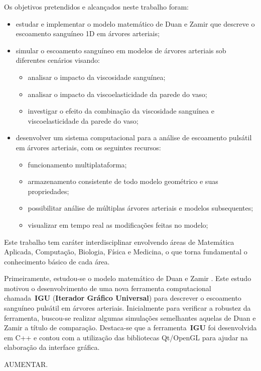 \documentclass[
        english,			
        brazil			        %
        ,<...>]{abntbibufjf}
\begin{document}
Os objetivos pretendidos e alcançados neste trabalho foram:
\begin{itemize}
	\item estudar e implementar o modelo matemático de Duan e Zamir que descreve o escoamento sanguíneo 1D em árvores arteriais;
	\item simular o escoamento sanguíneo em modelos de árvores arteriais sob diferentes cenários visando:
	\begin{itemize}
		\item analisar o impacto da viscosidade sanguínea;
		\item analisar o impacto da viscoelasticidade da parede do vaso;
		\item investigar o efeito da combinação da viscosidade sanguínea e viscoelasticidade da parede do vaso;
	\end{itemize} 
	\item desenvolver um sistema computacional para a análise de escoamento pulsátil em árvores arteriais, com os seguintes recursos:
	\begin{itemize}
		\item funcionamento multiplataforma;
		\item armazenamento consistente de todo modelo geométrico e suas propriedades;
		\item possibilitar análise de múltiplas árvores arteriais e modelos subsequentes;
		\item visualizar em tempo real as modificações feitas no modelo;
	\end{itemize} 
\end{itemize}

Este trabalho tem caráter interdisciplinar envolvendo áreas de Matemática Aplicada,
Computação, Biologia, Física e Medicina, o que torna fundamental o conhecimento
básico de cada área.

Primeiramente, estudou-se o modelo matemático de Duan e Zamir \cite{Duan}. Este estudo motivou o desenvolvimento de uma nova ferramenta computacional chamada~\textbf{IGU} (\textbf{Iterador Gráfico Universal}) para descrever o escoamento sanguíneo pulsátil em árvores arteriais. Inicialmente para verificar a robustez da ferramenta, buscou-se realizar algumas simulações semelhantes aquelas de Duan e Zamir a título de comparação. Destaca-se que a ferramenta~\textbf{IGU} foi desenvolvida em C++ e  contou com a utilização das bibliotecas Qt/OpenGL para ajudar na elaboração da interface gráfica.

AUMENTAR.
\end{document}

